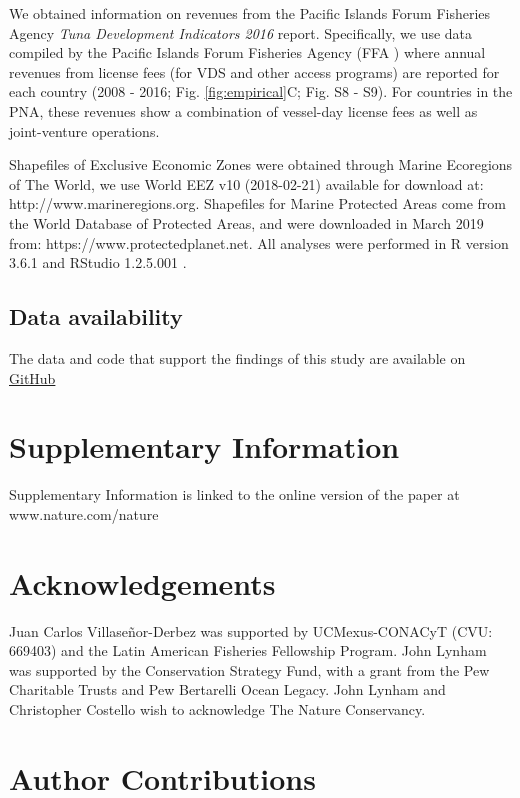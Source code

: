\documentclass[12pt]{article}
\begin{document}
We obtained information on revenues from the Pacific Islands Forum Fisheries Agency \emph{Tuna Development Indicators 2016} report.  Specifically, we use data compiled by the Pacific Islands Forum Fisheries Agency (FFA \cite{ffa_2017}) where annual revenues from license fees (for VDS and other access programs) are reported for each country (2008 - 2016; Fig. \ref{fig:empirical}C; Fig. S8 - S9). For countries in the PNA, these revenues show a combination of vessel-day license fees as well as joint-venture operations.

Shapefiles of Exclusive Economic Zones were obtained through Marine Ecoregions of The World, we use World EEZ v10 (2018-02-21) available for download at: http://www.marineregions.org. Shapefiles for Marine Protected Areas come from the World Database of Protected Areas, and were downloaded in March 2019 from: https://www.protectedplanet.net. All analyses were performed in R version 3.6.1 and RStudio 1.2.5.001 \cite{rcore_2019}.

\subsection{Data availability}

The data and code that support the findings of this study are available on \href{https://github.com/jcvdav/MPA_displacement}{GitHub}




\section{Supplementary Information}

Supplementary Information is linked to the online version of the paper at www.nature.com/nature

\section{Acknowledgements}

Juan Carlos Villaseñor-Derbez was supported by UCMexus-CONACyT (CVU: 669403) and the Latin American Fisheries Fellowship Program. John Lynham was supported by the Conservation Strategy Fund, with a grant from the Pew Charitable Trusts and Pew Bertarelli Ocean Legacy. John Lynham and Christopher Costello wish to acknowledge The Nature Conservancy.


\section{Author Contributions}
\end{document}
